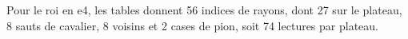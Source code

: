 Pour le roi en e4, les tables donnent 56 indices de rayons, dont 27 sur le plateau, 8 sauts de cavalier, 8 voisins et 2 cases de pion, soit 74 lectures par plateau.
